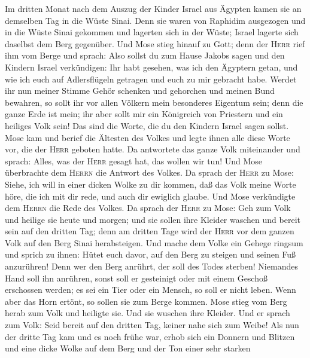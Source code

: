  Im dritten Monat nach dem Auszug der Kinder Israel aus
Ägypten kamen sie an demselben Tag in die Wüste Sinai. 
Denn sie waren von Raphidim ausgezogen und in die Wüste Sinai gekommen
und lagerten sich in der Wüste; Israel lagerte sich daselbst dem Berg
gegenüber.  Und Mose stieg hinauf zu Gott; denn der
\textsc{Herr} rief ihm vom Berge und sprach: Also sollst du zum Hause
Jakobs sagen und den Kindern Israel verkündigen:  Ihr habt
gesehen, was ich den Ägyptern getan, und wie ich euch auf Adlersflügeln
getragen und euch zu mir gebracht habe.  Werdet ihr nun
meiner Stimme Gehör schenken und gehorchen und meinen Bund bewahren, so
sollt ihr vor allen Völkern mein besonderes Eigentum sein; denn die
ganze Erde ist mein;  ihr aber sollt mir ein Königreich
von Priestern und ein heiliges Volk sein! Das sind die Worte, die du den
Kindern Israel sagen sollst.  Mose kam und berief die
Ältesten des Volkes und legte ihnen alle diese Worte vor, die der
\textsc{Herr} geboten hatte.  Da antwortete das ganze Volk
miteinander und sprach: Alles, was der \textsc{Herr} gesagt hat, das
wollen wir tun! Und Mose überbrachte dem \textsc{Herrn} die Antwort des
Volkes.  Da sprach der \textsc{Herr} zu Mose: Siehe, ich
will in einer dicken Wolke zu dir kommen, daß das Volk meine Worte höre,
die ich mit dir rede, und auch dir ewiglich glaube. Und Mose verkündigte
dem \textsc{Herrn} die Rede des Volkes.  Da sprach der
\textsc{Herr} zu Mose: Geh zum Volk und heilige sie heute und morgen;
und sie sollen ihre Kleider waschen  und bereit sein auf
den dritten Tag; denn am dritten Tage wird der \textsc{Herr} vor dem
ganzen Volk auf den Berg Sinai herabsteigen.  Und mache
dem Volke ein Gehege ringsum und sprich zu ihnen: Hütet euch davor, auf
den Berg zu steigen und seinen Fuß anzurühren! Denn wer den Berg
anrührt, der soll des Todes sterben!  Niemandes Hand soll
ihn anrühren, sonst soll er gesteinigt oder mit einem Geschoß erschossen
werden; es sei ein Tier oder ein Mensch, so soll er nicht leben. Wenn
aber das Horn ertönt, so sollen sie zum Berge kommen. 
Mose stieg vom Berg herab zum Volk und heiligte sie. Und sie wuschen
ihre Kleider.  Und er sprach zum Volk: Seid bereit auf
den dritten Tag, keiner nahe sich zum Weibe!  Als nun der
dritte Tag kam und es noch frühe war, erhob sich ein Donnern und Blitzen
und eine dicke Wolke auf dem Berg und der Ton einer sehr starken
